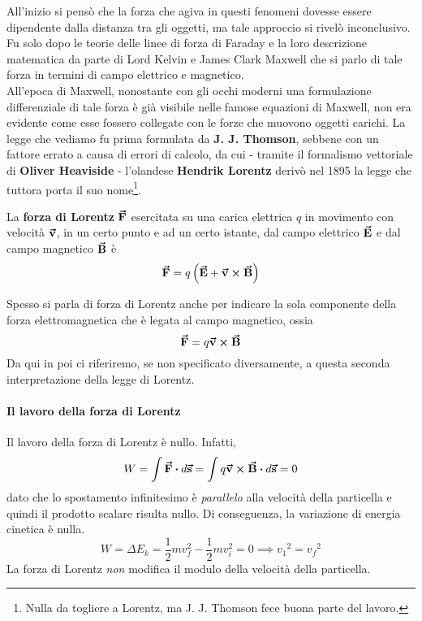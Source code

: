 All'inizio si pensò che la forza che agiva in questi fenomeni dovesse essere dipendente dalla distanza tra gli oggetti, ma tale approccio si rivelò inconclusivo. Fu solo dopo le teorie delle linee di forza di Faraday e la loro descrizione matematica da parte di Lord Kelvin e James Clark Maxwell che si parlo di tale forza in termini di campo elettrico e magnetico.\\
All'epoca di Maxwell, nonostante con gli occhi moderni una formulazione differenziale di tale forza è già visibile nelle famose equazioni di Maxwell, non era evidente come esse fossero collegate con le forze che muovono oggetti carichi. La legge che vediamo fu prima formulata da \textbf{J. J. Thomson}, sebbene con un fattore errato a causa di errori di calcolo, da cui - tramite il formalismo vettoriale di \textbf{Oliver Heaviside} - l'olandese \textbf{Hendrik Lorentz} derivò nel 1895 la legge che tuttora porta il suo nome\footnote{Nulla da togliere a Lorentz, ma J. J. Thomson fece buona parte del lavoro.}.
\begin{define}
	La \textbf{forza di Lorentz} $\vb*{\va{F}}$ esercitata su una carica elettrica $q$ in movimento con velocità $\vb*{\va{v}}$, in un certo punto e ad un certo istante, dal campo elettrico $\vb*{\va{E}}$ e dal campo magnetico $\vb*{\va{B}}$ è
	\begin{equation}
		\vb*{\va{F}}=q\left(\vb*{\va{E}}+\vb*{\va{v}}\cross\vb*{\va{B}}\right)
	\end{equation}
\end{define}
Spesso si parla di forza di Lorentz anche per indicare la sola componente della forza elettromagnetica che è legata al campo magnetico, ossia
\begin{equation}
	\vb*{\va{F}}=q\vb*{\va{v}}\cross\vb*{\va{B}}
\end{equation}
Da qui in poi ci riferiremo, se non specificato diversamente, a questa seconda interpretazione della legge di Lorentz.
\paragraph{Il lavoro della forza di Lorentz}
Il lavoro della forza di Lorentz è nullo. Infatti,
\begin{equation}
	W=\int \vba{F}\vdot d\vba{s}=\int q\vba{v}\cross\vba{B}\vdot d\vba{s}=0
\end{equation}
dato che lo spostamento infinitesimo è \textit{parallelo} alla velocità della particella e quindi il prodotto scalare risulta nullo. Di conseguenza, la variazione di energia cinetica è nulla.
\begin{equation*}
	W=\Delta E_k=\frac{1}{2}mv_{f}^2-\frac{1}{2}mv_{i}^2=0\implies{v_1}^2={v_f}^2
\end{equation*}
La forza di Lorentz \textit{non} modifica il modulo della velocità della particella.
